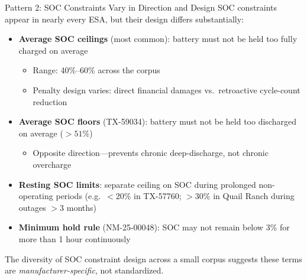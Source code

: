 \begin{frame}{Pattern 2: SOC Constraints Vary in Direction and Design}
SOC constraints appear in nearly every ESA, but their design differs substantially:
\vspace{0.2cm}
\begin{itemize}
    \item \textbf{Average SOC ceilings} (most common): battery must not be held too fully charged on average
    \begin{itemize}
        \item Range: 40\%--60\% across the corpus
        \item Penalty design varies: direct financial damages vs.\ retroactive cycle-count reduction
    \end{itemize}
    \pause
    \item \textbf{Average SOC floors} (TX-59034): battery must not be held too discharged on average ($>51\%$)
    \begin{itemize}
        \item Opposite direction---prevents chronic deep-discharge, not chronic overcharge
    \end{itemize}
    \pause
    \item \textbf{Resting SOC limits}: separate ceiling on SOC during prolonged non-operating periods (e.g.\ $<$20\% in TX-57760; $>$30\% in Quail Ranch during outages $>$3 months)
    \pause
    \item \textbf{Minimum hold rule} (NM-25-00048): SOC may not remain below 3\% for more than 1 hour continuously
\end{itemize}
\vspace{0.2cm}
The diversity of SOC constraint design across a small corpus suggests these terms are \textit{manufacturer-specific}, not standardized.
\end{frame}

